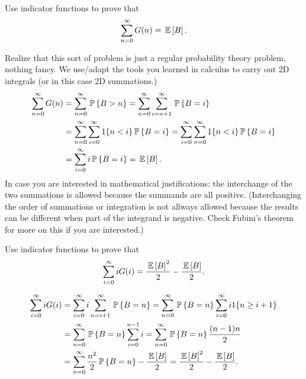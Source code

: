 \begin{question}\label{ex:6}
 Use indicator functions to prove that
    \begin{equation*}
      \sum_{n=0}^\infty G(n) = \,\mathbb{E}\left[B\right].
    \end{equation*}
\begin{solution}
  Realize that this sort of problem is just a regular probability
  theory problem, nothing fancy. We use/adapt the tools you learned in
  calculus to carry out 2D integrals (or in this case 2D summations.)
\begin{align*}
\sum_{n=0}^\infty G(n) 
&= \sum_{n=0}^\infty \,\mathbb{P}\left\{B>n\right\} 
= \sum_{n=0}^\infty \sum_{i=n+1}^\infty \,\mathbb{P}\left\{B=i\right\}  \\
& = \sum_{n=0}^\infty \sum_{i=0}^\infty 1\{n<i\} \,\mathbb{P}\left\{B=i\right\} 
= \sum_{i=0}^\infty \sum_{n=0}^\infty 1 \{n<i\} \,\mathbb{P}\left\{B=i\right\} \\
&= \sum_{i=0}^\infty i \,\mathbb{P}\left\{B=i\right\} = \,\mathbb{E}\left[B\right].
\end{align*}
In case you are interested in mathematical justifications: the
interchange of the two summations is allowed because the summands are
all positive. (Interchanging the order of summations or integration is
not allways allowed because the results can be different when part of
the integrand is negative. Check Fubini's theorem for more on this if
you are interested.)

\end{solution}
\end{question}

\begin{question}
 Use indicator functions to prove that
    \begin{equation*}
\sum_{i=0}^\infty i G(i) =  \frac{\,\mathbb{E}\left[B\right]^2}2 - \frac{\,\mathbb{E}\left[B\right]}{2}.
    \end{equation*}
\begin{solution}
\begin{align*}
\sum_{i=0}^\infty i G(i)
&= \sum_{i=0}^\infty i \sum_{n=i+1}^\infty \,\mathbb{P}\left\{B=n\right\} = \sum_{n=0}^\infty \,\mathbb{P}\left\{B=n\right\} \sum_{i=0}^\infty i 1\{n\geq i+1\} \\
&= \sum_{n=0}^\infty \,\mathbb{P}\left\{B=n\right\} \sum_{i=0}^{n-1}i  = \sum_{n=0}^\infty \,\mathbb{P}\left\{B=n\right\} \frac{(n-1)n}{2} \\
&= \sum_{n=0}^\infty  \frac{n^2}{2} \,\mathbb{P}\left\{B=n\right\} - \frac{\,\mathbb{E}\left[B\right]}{2}
= \frac{\,\mathbb{E}\left[B\right]^2}2 - \frac{\,\mathbb{E}\left[B\right]}{2}.
\end{align*}
\end{solution}
\end{question}


